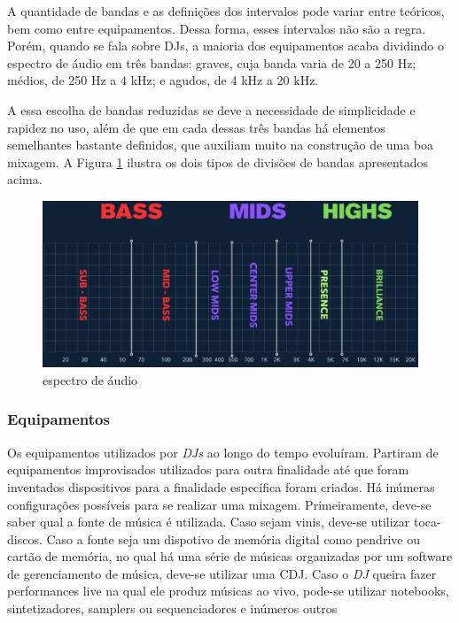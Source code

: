 A quantidade de bandas e as definições dos intervalos pode variar entre teóricos, bem como entre equipamentos. Dessa forma, esses intervalos não são a regra. Porém, quando se fala sobre DJs, a maioria dos equipamentos acaba dividindo o espectro de áudio em três bandas: graves, cuja banda varia de 20 a 250 Hz; médios, de 250 Hz a 4 kHz; e agudos, de 4 kHz a 20 kHz.
\par
A essa escolha de bandas reduzidas se deve a necessidade de simplicidade e rapidez no uso, além de que em cada dessas três bandas há elementos semelhantes bastante definidos, que auxiliam muito na construção de uma boa mixagem. A Figura \ref{fig09} ilustra os dois tipos de divisões de bandas apresentados acima. 

\begin{figure}[h]
	\centering
    \includegraphics[scale=0.4]{figuras/fig09.eps}
	\caption{espectro de áudio}
	\label{fig09}
\end{figure}


\subsubsection{Equipamentos}
Os equipamentos utilizados por \textit{DJs} ao longo do tempo evoluíram. Partiram de equipamentos improvisados utilizados para outra finalidade até que foram inventados dispositivos para a finalidade específica foram criados.
Há inúmeras configurações possíveis para se realizar uma mixagem. Primeiramente, deve-se saber qual a fonte de música é utilizada. Caso sejam vinis, deve-se utilizar toca-discos. Caso a fonte seja um dispotivo de memória digital como pendrive ou cartão de memória, no qual há uma série de músicas organizadas por um software de gerenciamento de música, deve-se utilizar uma CDJ. Caso o \textit{DJ} queira fazer performances live na qual ele produz músicas ao vivo, pode-se utilizar notebooks, sintetizadores, samplers ou sequenciadores e inúmeros outros 


